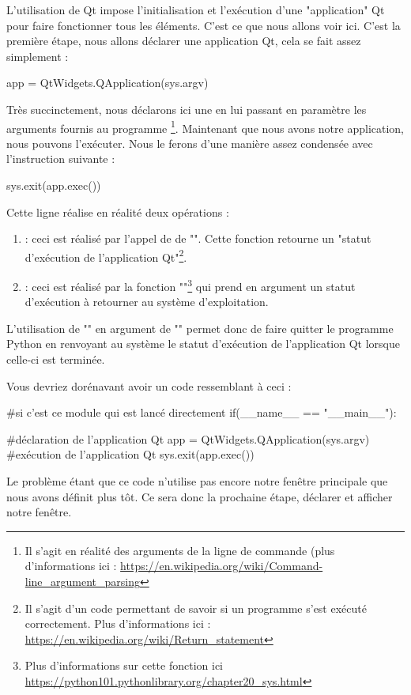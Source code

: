 \documentclass[12pt]{report}    %
\begin{document}
L'utilisation de Qt impose l'initialisation et l'exécution d'une "application" Qt pour faire fonctionner tous les éléments. C'est ce que nous allons voir ici.\newline
C'est la première étape, nous allons déclarer une application Qt, cela se fait assez simplement :
\begin{pyCode}
app = QtWidgets.QApplication(sys.argv)
\end{pyCode}
Très succinctement, nous déclarons ici une  en lui passant en paramètre les arguments fournis au programme
\footnote{Il s'agit en réalité des arguments de la ligne de commande (plus d'informations ici : \url{https://en.wikipedia.org/wiki/Command-line_argument_parsing}}.\newline
Maintenant que nous avons notre application, nous pouvons l'exécuter. Nous le ferons d'une manière assez condensée avec l'instruction suivante :
\begin{pyCode}
sys.exit(app.exec())
\end{pyCode}
Cette ligne réalise en réalité deux opérations :
\begin{enumerate}
    \item {} : ceci est réalisé par l'appel de de "". Cette fonction retourne un "statut d'exécution de l'application Qt"\footnote{Il s'agit d'un code permettant de savoir si un programme s'est exécuté correctement.\newline
    Plus d'informations ici : \url{https://en.wikipedia.org/wiki/Return_statement}}.
    
    \item {} : ceci est réalisé par la fonction ""\footnote{Plus d'informations sur cette fonction ici \url{https://python101.pythonlibrary.org/chapter20_sys.html}} qui prend en argument un statut d'exécution à retourner au système d'exploitation.
\end{enumerate}
L'utilisation de "" en argument de "" permet donc de faire quitter le programme Python en renvoyant au système le statut d'exécution de l'application Qt lorsque celle-ci est terminée.\smallSkip

Vous devriez dorénavant avoir un code ressemblant à ceci :
\begin{pyCode}
#si c'est ce module qui est lancé directement
if(__name__ == "__main__"):

	#déclaration de l'application Qt
	app = QtWidgets.QApplication(sys.argv)
	#exécution de l'application Qt
	sys.exit(app.exec())
\end{pyCode}
Le problème étant que ce code n'utilise pas encore notre fenêtre principale que nous avons définit plus tôt.\newline
Ce sera donc la prochaine étape, déclarer et afficher notre fenêtre.
\end{document}
